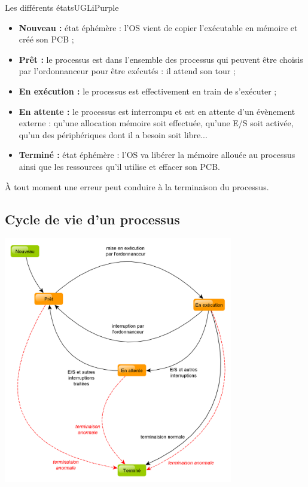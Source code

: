 \documentclass[10pt,firamath,cours]{nsi}
\begin{document}
\begin{encadrecolore}{Les différents états}{UGLiPurple}
    \begin{itemize}
        \item \textbf{Nouveau : } état éphémère : l'OS vient de copier l'exécutable en mémoire et créé son PCB ; 
        \item \textbf{Prêt : } le processus est dans l'ensemble des processus qui peuvent être choisis par l'ordonnanceur pour être exécutés : il attend son tour ;
        \item \textbf{En exécution :} le processus est effectivement en train de s'exécuter ;
        \item \textbf{En attente :} le processus est interrompu et est en attente d'un évènement externe : qu'une allocation mémoire soit effectuée, qu'une E/S soit activée, qu'un des périphériques dont il a besoin soit libre...
        \item \textbf{Terminé :} état éphémère : l'OS va libérer la mémoire allouée au processus ainsi que les ressources qu'il utilise et effacer son PCB.
    \end{itemize}
    À tout moment une erreur peut conduire à la terminaison du processus.        
\end{encadrecolore}

\subsection{Cycle de vie d'un processus}
\begin{center}
\includegraphics[width=10cm]{img/cycle_proc}
\end{center}
\end{document}

